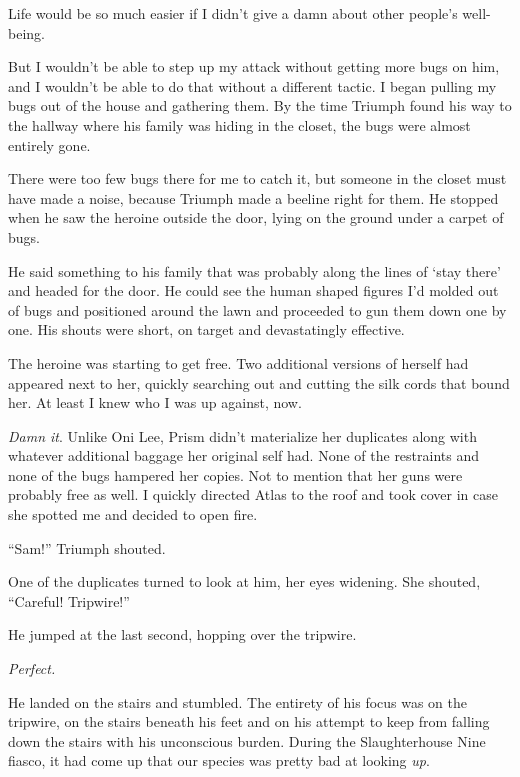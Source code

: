 Life would be so much easier if I didn't give a damn about other people's well-being.



But I wouldn't be able to step up my attack without getting more bugs on him, and I wouldn't be able to do that without a different tactic.  I began pulling my bugs out of the house and gathering them.  By the time Triumph found his way to the hallway where his family was hiding in the closet, the bugs were almost entirely gone.



There were too few bugs there for me to catch it, but someone in the closet must have made a noise, because Triumph made a beeline right for them.  He stopped when he saw the heroine outside the door, lying on the ground under a carpet of bugs.



He said something to his family that was probably along the lines of `stay there' and headed for the door.  He could see the human shaped figures I'd molded out of bugs and positioned around the lawn and proceeded to gun them down one by one.  His shouts were short, on target and devastatingly effective.



The heroine was starting to get free.  Two additional versions of herself had appeared next to her, quickly searching out and cutting the silk cords that bound her.  At least I knew who I was up against, now.



\emph{Damn it}.  Unlike Oni Lee, Prism didn't materialize her duplicates along with whatever additional baggage her original self had.  None of the restraints and none of the bugs hampered her copies.  Not to mention that her guns were probably free as well.  I quickly directed Atlas to the roof and took cover in case she spotted me and decided to open fire.



``Sam!'' Triumph shouted.



One of the duplicates turned to look at him, her eyes widening.  She shouted, ``Careful!  Tripwire!''



He jumped at the last second, hopping over the tripwire.



\emph{Perfect.}



He landed on the stairs and stumbled.  The entirety of his focus was on the tripwire, on the stairs beneath his feet and on his attempt to keep from falling down the stairs with his unconscious burden.  During the Slaughterhouse Nine fiasco, it had come up that our species was pretty bad at looking \emph{up}.



